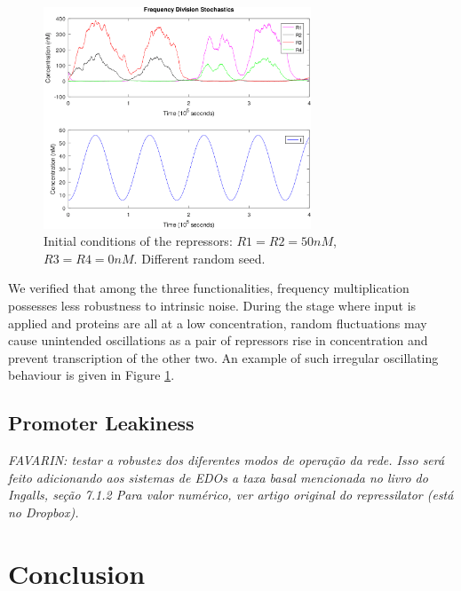     \begin{figure}[!htbp]
      \centering
      \includegraphics[width=0.71\textwidth]{img/stochastic-freqdiv-skip-1.png}
      \caption{Initial conditions of the repressors: $R1 = R2 = 50nM$, $R3 = R4 = 0nM$. Different random seed.}
      \label{fig.stochastic-freqdiv-skip}
    \end{figure}

    We verified that among the three functionalities, frequency multiplication possesses less robustness to intrinsic noise.
    During the stage where input is applied and proteins are all at a low concentration, random fluctuations may cause unintended oscillations as a pair of repressors rise in concentration and prevent transcription of the other two.
    An example of such irregular oscillating behaviour is given in Figure \ref{fig.stochastic-freqdiv-skip}.


  \subsection{Promoter Leakiness}

    \textit{FAVARIN: testar a robustez dos diferentes modos de operação da rede.
    Isso será feito adicionando aos sistemas de EDOs a taxa basal mencionada no livro do Ingalls, seção 7.1.2
    Para valor numérico, ver artigo original do repressilator (está no Dropbox).}


\section{Conclusion}

